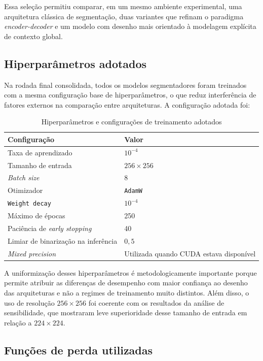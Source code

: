 \documentclass[tcc,capa]{texufpel}
\begin{document}
Essa seleção permitiu comparar, em um mesmo ambiente experimental, uma arquitetura clássica de segmentação, duas variantes que refinam o paradigma \textit{encoder-decoder} e um modelo com desenho mais orientado à modelagem explícita de contexto global.

\subsection{Hiperparâmetros adotados}

Na rodada final consolidada, todos os modelos segmentadores foram treinados com a mesma configuração base de hiperparâmetros, o que reduz interferência de fatores externos na comparação entre arquiteturas. A configuração adotada foi:

\begin{table}[htbp]
	\centering
	\caption{Hiperparâmetros e configurações de treinamento adotados}
	\label{tab:hiperparametros_treinamento}
	\begin{tabular}{|l|l|}
		\hline
		\textbf{Configuração} & \textbf{Valor} \\ \hline
		Taxa de aprendizado & \(10^{-4}\) \\ \hline
		Tamanho de entrada & \(256 \times 256\) \\ \hline
		\textit{Batch size} & 8 \\ \hline
		Otimizador & \texttt{AdamW} \\ \hline
		\texttt{Weight decay} & \(10^{-4}\) \\ \hline
		Máximo de épocas & 250 \\ \hline
		Paciência de \textit{early stopping} & 40 \\ \hline
		Limiar de binarização na inferência & \(0{,}5\) \\ \hline
		\textit{Mixed precision} & Utilizada quando CUDA estava disponível \\ \hline
	\end{tabular}
\end{table}

A uniformização desses hiperparâmetros é metodologicamente importante porque permite atribuir as diferenças de desempenho com maior confiança ao desenho das arquiteturas e não a regimes de treinamento muito distintos. Além disso, o uso de resolução \(256 \times 256\) foi coerente com os resultados da análise de sensibilidade, que mostraram leve superioridade desse tamanho de entrada em relação a \(224 \times 224\).

\subsection{Funções de perda utilizadas}
\end{document}
